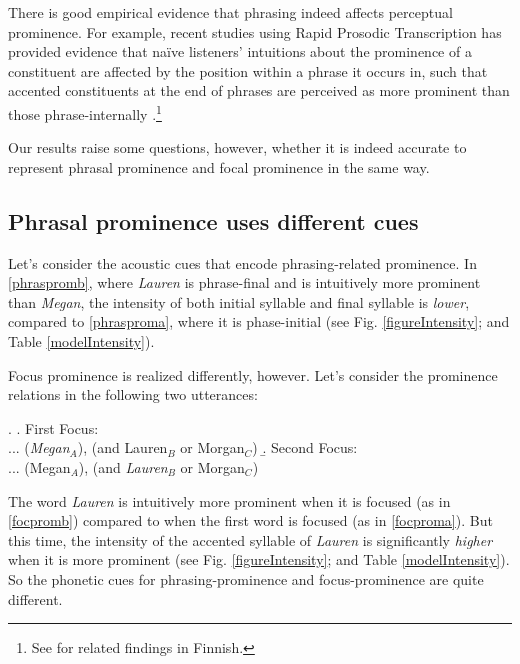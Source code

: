 \documentclass[preprint,review,12pt,authoryear,times]{elsarticle}
\begin{document}
There is good empirical evidence that phrasing indeed affects perceptual prominence. For example, recent studies using Rapid Prosodic Transcription \citep{cole10rapid} has provided evidence that na\"ive listeners' intuitions about the prominence of a constituent are affected by the position within a phrase it occurs in, such that accented constituents at the end of phrases are perceived as more prominent than those phrase-internally \citep[see also][]{bisho19,cole19}.\footnote{See \citet{vaini06} for related findings in Finnish.}  

Our results raise some questions, however, whether it is indeed accurate to represent phrasal prominence and focal prominence in the same way. 


\subsection{Phrasal prominence uses different cues}

Let's consider the acoustic cues that encode phrasing-related  prominence.  In \ref{phraspromb}, where {\em Lauren} is phrase-final and is intuitively more prominent than {\em Megan}, the intensity of both initial syllable and final syllable is {\em lower}, compared to \ref{phrasproma}, where it is phase-initial (see Fig. \ref{figureIntensity}; and Table \ref{modelIntensity}).  

Focus prominence is realized differently, however. Let's consider the prominence relations in the following two utterances:

\ex.\label{focprom}
\a. First Focus:\\
 ... ({\em Megan}$_A$), (and {Lauren}$_B$ or Morgan$_C$)\label{focproma}
\b. Second Focus:\\
... (Megan$_A$), (and {\em Lauren}$_B$ or Morgan$_C$) \label{focpromb}

The word {\em Lauren} is intuitively more prominent when it is focused (as in \ref{focpromb}) compared to when the first word is focused (as in \ref{focproma}). But this time, the intensity of the accented syllable of {\em Lauren} is significantly {\em higher} when it is more prominent (see Fig. \ref{figureIntensity}; and Table \ref{modelIntensity}). So the phonetic cues for phrasing-prominence and focus-prominence are quite different. 
\end{document}
